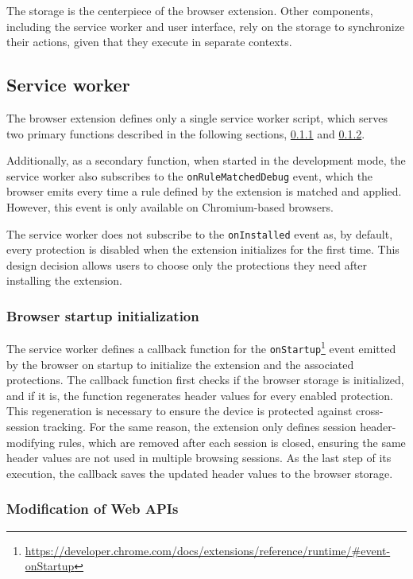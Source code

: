 The storage is the centerpiece of the browser extension. Other components, including the service worker and user interface, rely on the storage to synchronize their actions, given that they execute in separate contexts.

\subsection{Service worker}

The browser extension defines only a single service worker script, which serves two primary functions described in the following sections, \ref{SubSubSection:StartupInitialization} and \ref{SubSubSection:APIModifications}.

Additionally, as a secondary function, when started in the development mode, the service worker also subscribes to the \texttt{onRuleMatchedDebug} event, which the browser emits every time a rule defined by the extension is matched and applied. However, this event is only available on Chromium-based browsers.

The service worker does not subscribe to the \texttt{onInstalled} event as, by default, every protection is disabled when the extension initializes for the first time. This design decision allows users to choose only the protections they need after installing the extension.

\subsubsection{Browser startup initialization}
\label{SubSubSection:StartupInitialization}

The service worker defines a callback function for the \texttt{onStartup}\footnote{\url{https://developer.chrome.com/docs/extensions/reference/runtime/\#event-onStartup}} event emitted by the browser on startup to initialize the extension and the associated protections. The callback function first checks if the browser storage is initialized, and if it is, the function regenerates header values for every enabled protection. This regeneration is necessary to ensure the device is protected against cross-session tracking. For the same reason, the extension only defines session header-modifying rules, which are removed after each session is closed, ensuring the same header values are not used in multiple browsing sessions. As the last step of its execution, the callback saves the updated header values to the browser storage.

\subsubsection{Modification of Web APIs}
\label{SubSubSection:APIModifications}

